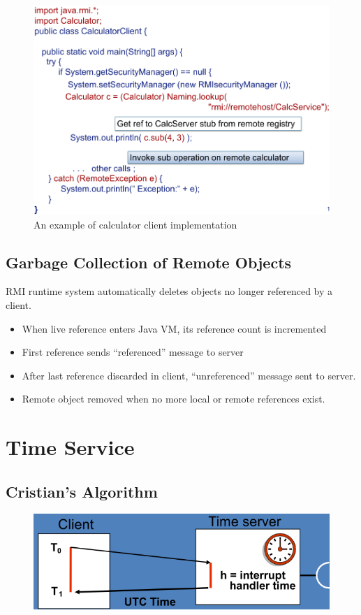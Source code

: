 \documentclass[twocolumn,landscape,10pt]{article}
\theoremstyle{definition}
\begin{document}
\begin{figure}[h]
  	\includegraphics[scale=0.30]{calc_client.png}
  	\centering
    \caption{An example of calculator client implementation}
\end{figure}

\subsection{Garbage Collection of Remote Objects}

RMI runtime system automatically deletes objects no longer referenced by a
client.
\begin{itemize}
    \item When live reference enters Java VM, its reference count is incremented
    \item First reference sends ``referenced'' message to server
    \item After last reference discarded in client, ``unreferenced'' message
        sent to server.
    \item Remote object removed when no more local or remote references exist.
\end{itemize} 


\section{Time Service}

\subsection{Cristian's Algorithm}

\begin{figure}[h]
  	\includegraphics[scale=0.35]{cristian.png}
  	\centering
\end{figure}
\end{document}
